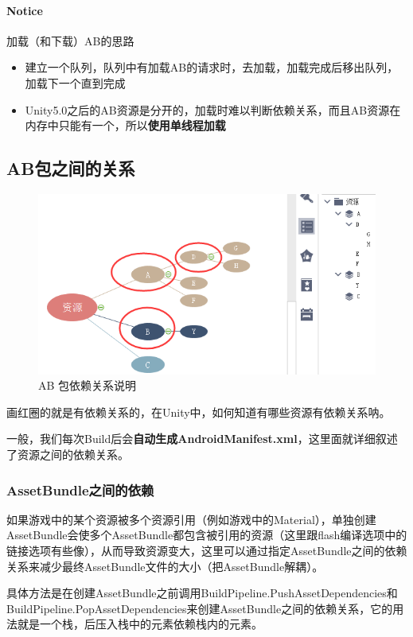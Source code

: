 \documentclass[UTF8,a4paper,12pt]{ctexbook}
\begin{document}
			
			\paragraph{Notice}加载（和下载）AB的思路
				\begin{itemize}
					\item 建立一个队列，队列中有加载AB的请求时，去加载，加载完成后移出队列，加载下一个直到完成
					\item Unity5.0之后的AB资源是分开的，加载时难以判断依赖关系，而且AB资源在内存中只能有一个，所以\textbf{使用单线程加载}
				\end{itemize}
		\subsection{AB包之间的关系}
			\begin{figure}[H]
				\centering
				\includegraphics[scale=0.64]{AbRelative}
				\caption{AB 包依赖关系说明}
			\end{figure}
			
			画红圈的就是有依赖关系的，在Unity中，如何知道有哪些资源有依赖关系呐。	
			
			一般，我们每次Build后会\textbf{自动生成AndroidManifest.xml}，这里面就详细叙述了资源之间的依赖关系。
			
			\subsubsection{AssetBundle之间的依赖}	
			
				如果游戏中的某个资源被多个资源引用（例如游戏中的Material），单独创建AssetBundle会使多个AssetBundle都包含被引用的资源（这里跟flash编译选项中的链接选项有些像），从而导致资源变大，这里可以通过指定AssetBundle之间的依赖关系来减少最终AssetBundle文件的大小（把AssetBundle解耦）。
								
				具体方法是在创建AssetBundle之前调用BuildPipeline.PushAssetDependencies和BuildPipeline.PopAssetDependencies来创建AssetBundle之间的依赖关系，它的用法就是一个栈，后压入栈中的元素依赖栈内的元素。
		
\end{document}
